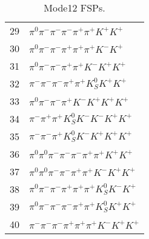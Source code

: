 \begin{table}[h!]
\begin{center}
\begin{tabular}{cl}
29 & $\pi^0 \pi^- \pi^- \pi^- \pi^+ \pi^+ K^+ K^+ $ \\
30 & $\pi^0 \pi^- \pi^- \pi^+ \pi^+ \pi^+ K^- K^+ $ \\
31 & $\pi^0 \pi^- \pi^- \pi^+ \pi^+ K^- K^+ K^+ $ \\
32 & $\pi^- \pi^- \pi^- \pi^+ \pi^+ K_S^0 K^+ K^+ $ \\
33 & $\pi^0 \pi^- \pi^- \pi^+ K^- K^+ K^+ K^+ $ \\
34 & $\pi^- \pi^+ \pi^+ K_S^0 K^- K^- K^+ K^+ $ \\
35 & $\pi^- \pi^- \pi^+ K_S^0 K^- K^+ K^+ K^+ $ \\
36 & $\pi^0 \pi^0 \pi^- \pi^- \pi^- \pi^+ \pi^+ K^+ K^+ $ \\
37 & $\pi^0 \pi^0 \pi^- \pi^- \pi^+ \pi^+ K^- K^+ K^+ $ \\
38 & $\pi^0 \pi^- \pi^- \pi^+ \pi^+ \pi^+ K_S^0 K^- K^+ $ \\
39 & $\pi^0 \pi^- \pi^- \pi^- \pi^+ \pi^+ K_S^0 K^+ K^+ $ \\
40 & $\pi^- \pi^- \pi^- \pi^+ \pi^+ \pi^+ K^- K^+ K^+ $ \\
\hline
\end{tabular}
\label{tab:Mode12FSPs}
\caption{Mode12 FSPs.}
\end{center}
\end{table}
